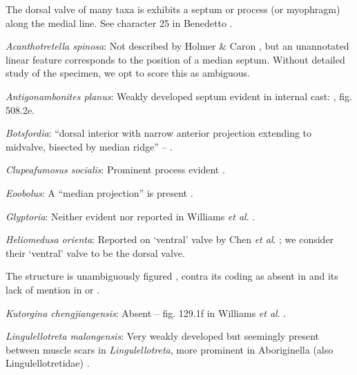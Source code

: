 \documentclass[openany]{book}
\theoremstyle{definition}
\theoremstyle{definition}
\theoremstyle{definition}
\theoremstyle{remark}
\begin{document}
The dorsal valve of many taxa is exhibits a septum or process (or
myophragm) along the medial line. See character 25 in Benedetto
\citeyearpar{Benedetto2009iChaniella}.

\hypertarget{Acanthotretella_spinosa-coding-33}{}
\emph{Acanthotretella spinosa}: Not described by Holmer \& Caron
\citeyearpar{Holmer2006Aspinose}, but an unannotated linear feature
corresponds to the position of a median septum. Without detailed study
of the specimen, we opt to score this as ambiguous.

\hypertarget{Antigonambonites_planus-coding-33}{}
\emph{Antigonambonites planus}: Weakly developed septum evident in
internal cast: \citet{Williams2000LinguliformeaCraniiformea}, fig.
508.2e.

\hypertarget{Botsfordia-coding-33}{}
\emph{Botsfordia}: ``dorsal interior with narrow anterior projection
extending to midvalve, bisected by median ridge'' --
\citet{Williams2000LinguliformeaCraniiformea}.

\hypertarget{Clupeafumosus_socialis-coding-33}{}
\emph{Clupeafumosus socialis}: Prominent process evident
\citep{Topper2013Reappraisalof}.

\hypertarget{Eoobolus-coding-33}{}
\emph{Eoobolus}: A ``median projection'' is present \citep[fig. 4g
in][]{Balthasar2009Thebrachiopod}.

\hypertarget{Glyptoria-coding-33}{}
\emph{Glyptoria}: Neither evident nor reported in Williams \emph{et al}.
\citeyearpar{Williams2000LinguliformeaCraniiformea}.

\hypertarget{Heliomedusa_orienta-coding-33}{}
\emph{Heliomedusa orienta}: Reported on `ventral' valve by Chen \emph{et
al}. \citeyearpar{Chen2007Reinterpretationof}; we consider their
`ventral' valve to be the dorsal valve.

The structure is unambiguously figured \citep[e.g.~fig. 5.1
in][]{Chen2007Reinterpretationof}, contra its coding as absent in
\citet{Williams2000LinguliformeaCraniiformea} and its lack of mention in
\citet{Williams2007Supplement} or \citet{Zhang2009Architectureand}.

\hypertarget{Kutorgina_chengjiangensis-coding-33}{}
\emph{Kutorgina chengjiangensis}: Absent -- fig. 129.1f in Williams
\emph{et al}. \citeyearpar{Williams2000LinguliformeaCraniiformea}.

\hypertarget{Lingulellotreta_malongensis-coding-33}{}
\emph{Lingulellotreta malongensis}: Very weakly developed but seemingly
present between muscle scars in \emph{Lingulellotreta}, more prominent
in Aboriginella (also Lingulellotretidae) \citep[fig.
34]{Williams2000LinguliformeaCraniiformea}.
\end{document}
